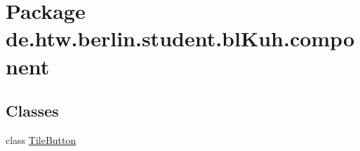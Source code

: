 \hypertarget{namespacede_1_1htw_1_1berlin_1_1student_1_1bl_kuh_1_1component}{\section{Package de.\-htw.\-berlin.\-student.\-bl\-Kuh.\-component}
\label{namespacede_1_1htw_1_1berlin_1_1student_1_1bl_kuh_1_1component}
}
\subsection*{Classes}
\begin{DoxyCompactItemize}
\item 
class \hyperlink{classde_1_1htw_1_1berlin_1_1student_1_1bl_kuh_1_1component_1_1_tile_button}{Tile\-Button}
\end{DoxyCompactItemize}
